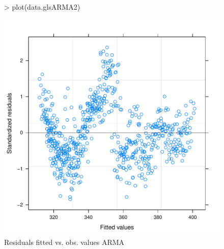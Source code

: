 \documentclass[11pt, a4paper]{article} %
\begin{document}
\begin{figure}[H]
\centering
\begin{Schunk}
\begin{Sinput}
> plot(data.glsARMA2)
\end{Sinput}
\end{Schunk}
\includegraphics{alleselena-044}
\caption{Residuals fitted vs. obs. values ARMA}
\label{comparison_finalgls2}
\end{figure}
\end{document}
